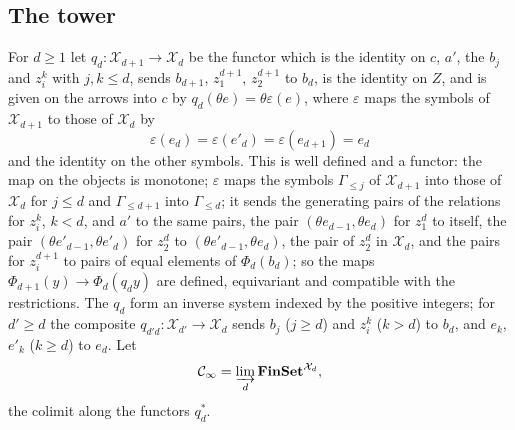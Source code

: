 \documentclass[11pt]{amsart}
\theoremstyle{definition}
\newcommand{\Fin}{\mathbf{FinSet}}
\newcommand{\cX}{\mathcal X}
\newcommand{\cC}{\mathcal C}
\begin{document}
\subsection*{The tower}
For $d\ge1$ let $q_d\colon\cX_{d+1}\to\cX_d$ be the functor which is
the identity on $c$, $a'$, the $b_j$ and $z^k_i$ with $j,k\le d$,
sends $b_{d+1}$, $z^{d+1}_1$, $z^{d+1}_2$ to $b_d$, is the identity on
$Z$, and is given on the arrows into $c$ by $q_d(\theta e)=\theta
\varepsilon(e)$, where $\varepsilon$ maps the symbols of $\cX_{d+1}$
to those of $\cX_d$ by
\[
\varepsilon(e_d)=\varepsilon(e'_d)=\varepsilon(e_{d+1})=e_d
\]
and the identity on the other symbols. This is well defined and a
functor: the map on the objects is monotone; $\varepsilon$ maps the
symbols $\Gamma_{\le j}$ of $\cX_{d+1}$ into those of $\cX_d$ for
$j\le d$ and $\Gamma_{\le d+1}$ into $\Gamma_{\le d}$; it sends the
generating pairs of the relations for $z^k_i$, $k<d$, and $a'$ to the
same pairs, the pair $(\theta e_{d-1},\theta e_d)$ for $z^d_1$ to
itself, the pair $(\theta e'_{d-1},\theta e'_d)$ for $z^d_2$ to
$(\theta e'_{d-1},\theta e_d)$, the pair of $z^d_2$ in $\cX_d$, and
the pairs for $z^{d+1}_i$ to pairs of equal elements of $\Phi_d(b_d)$;
so the maps $\Phi_{d+1}(y)\to\Phi_d(q_dy)$ are defined, equivariant
and compatible with the restrictions. The $q_d$ form an inverse system
indexed by the positive integers; for $d'\ge d$ the composite
$q_{d'd}\colon\cX_{d'}\to\cX_d$ sends $b_j$ ($j\ge d$) and $z^k_i$
($k>d$) to $b_d$, and $e_k$, $e'_k$ ($k\ge d$) to $e_d$. Let
\[
\cC_\infty=\varinjlim_d\Fin^{\cX_d},
\]
the colimit along the functors $q_d^*$.
\end{document}
